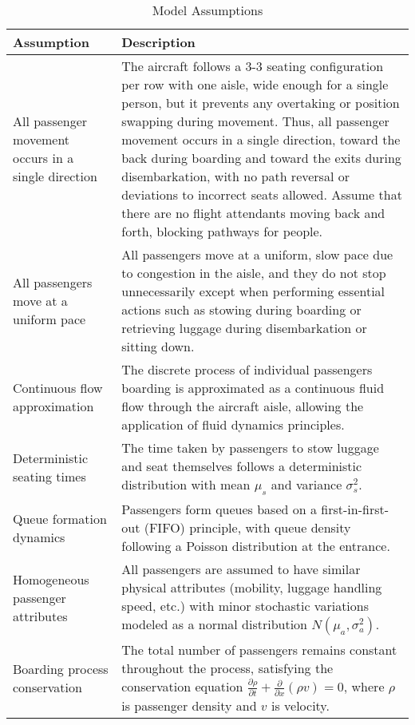 \documentclass[a4paper,12pt]{article}
\begin{document}
\begin{table}[htbp]
\centering
\caption{Model Assumptions}
\label{tab:assumptions}
\begin{tabular}{p{}p{}}
\toprule
\textbf{Assumption} & \textbf{Description} \\
\midrule
All passenger movement occurs in a single direction & The aircraft follows a 3-3 seating configuration per row with one aisle, wide enough for a single person, but it prevents any overtaking or position swapping during movement. Thus, all passenger movement occurs in a single direction, toward the back during boarding and toward the exits during disembarkation, with no path reversal or deviations to incorrect seats allowed. Assume that there are no flight attendants moving back and forth, blocking pathways for people. \\
\midrule
All passengers move at a uniform pace & All passengers move at a uniform, slow pace due to congestion in the aisle, and they do not stop unnecessarily except when performing essential actions such as stowing during boarding or retrieving luggage during disembarkation or sitting down. \\
\midrule
Continuous flow approximation & The discrete process of individual passengers boarding is approximated as a continuous fluid flow through the aircraft aisle, allowing the application of fluid dynamics principles. \\
\midrule
Deterministic seating times & The time taken by passengers to stow luggage and seat themselves follows a deterministic distribution with mean $\mu_s$ and variance $\sigma_s^2$. \\
\midrule
Queue formation dynamics & Passengers form queues based on a first-in-first-out (FIFO) principle, with queue density following a Poisson distribution at the entrance. \\
\midrule
Homogeneous passenger attributes & All passengers are assumed to have similar physical attributes (mobility, luggage handling speed, etc.) with minor stochastic variations modeled as a normal distribution $N(\mu_a, \sigma_a^2)$. \\
\midrule
Boarding process conservation & The total number of passengers remains constant throughout the process, satisfying the conservation equation $\frac{\partial \rho}{\partial t} + \frac{\partial}{\partial x}(\rho v) = 0$, where $\rho$ is passenger density and $v$ is velocity. \\
\bottomrule
\end{tabular}
\end{table}
\end{document}
